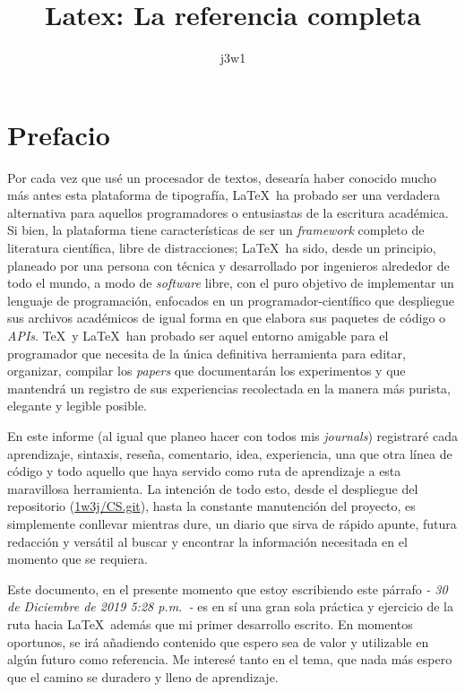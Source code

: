 \documentclass[11pt]{article}
\title{Latex: La referencia completa}
\author{j3w1}
\begin{document}
    \maketitle

    \section[Prefacio]{Prefacio}\label{sec:prefacio}
    Por cada vez que usé un procesador de textos, desearía haber conocido mucho más antes esta plataforma de tipografía, \LaTeX\ ha probado ser una verdadera alternativa para aquellos programadores o entusiastas de la escritura académica.
    Si bien, la plataforma tiene características de ser un \emph{framework} completo de literatura científica, libre de distracciones; \LaTeX\ ha sido, desde un principio, planeado por una persona con técnica y desarrollado por ingenieros alrededor de todo el mundo, a modo de \emph{software} libre, con el puro objetivo de implementar un lenguaje de programación, enfocados en un programador-científico que despliegue sus archivos académicos de igual forma en que elabora sus paquetes de código o \emph{APIs}. \TeX\ y \LaTeX\ han probado ser aquel entorno amigable para el programador que necesita de la única definitiva herramienta para editar, organizar, compilar los \emph{papers} que documentarán los experimentos y que mantendrá un registro de sus experiencias recolectada en la manera más purista, elegante y legible posible.

    En este informe (al igual que planeo hacer con todos mis \emph{journals}) registraré cada aprendizaje, sintaxis, reseña, comentario, idea, experiencia, una que otra línea de código y todo aquello que haya servido como ruta de aprendizaje a esta maravillosa herramienta.
    La intención de todo esto, desde el despliegue del repositorio (\href{https://github.com/1w3j/CS}{1w3j/CS.git}), hasta la constante manutención del proyecto, es simplemente conllevar mientras dure, un diario que sirva de rápido apunte, futura redacción y versátil al buscar y encontrar la información necesitada en el momento que se requiera.

    Este documento, en el presente momento que estoy escribiendo este párrafo \emph{- 30 de Diciembre de 2019 5:28 p.m.\ -} es en sí una gran sola práctica y ejercicio de la ruta hacia \LaTeX\ además que mi primer desarrollo escrito.
    En momentos oportunos, se irá añadiendo contenido que espero sea de valor y utilizable en algún futuro como referencia.
    Me interesé tanto en el tema, que nada más espero que el camino se duradero y lleno de aprendizaje.
\end{document}
